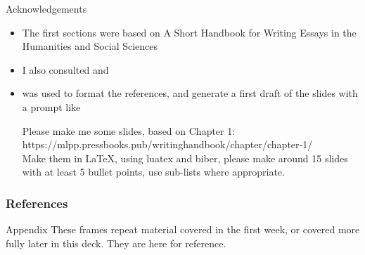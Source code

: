 \documentclass[aspectratio=169]{beamer}
\begin{document}

\begin{frame}[allowframebreaks]{Acknowledgements}

  \begin{itemize}
  \item The first sections were based on A Short Handbook for Writing Essays in the Humanities and Social Sciences \citep{writinghandbook}
  \item I also consulted \citet{Reid:2024} and \citet{Krause:2007}
  \item \textcite{openai-chatgpt-2025-03-14} was used to format the references, and generate a first draft of the slides with a prompt like
    \begin{flushleft}\ttfamily
       Please make me some slides, based on Chapter 1: https://mlpp.pressbooks.pub/writinghandbook/chapter/chapter-1/ \\

Make them in LaTeX, using luatex and biber, please make around 15 slides with at least 5 bullet points, use sub-lists where appropriate. \\
    \end{flushleft}
  \aicheck
  \end{itemize}
  
\end{frame}




\begin{frame}[allowframebreaks]
\frametitle{References}
\printbibliography[heading=none]
\end{frame}

\AtBeginSection[]{}
\appendix

\begin{frame}{Appendix}
These frames repeat material covered in the first week, or covered more
fully later in this deck.  They are here for reference.
\end{frame}
\end{document}
